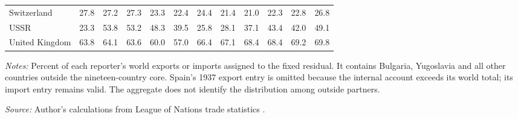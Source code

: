 \begin{landscape}
\begin{table}[!htbp]
\begin{threeparttable}
\begin{tabular}{@{}lrrrrrrrrrrr@{}}
Switzerland & 27.8 & 27.2 & 27.3 & 23.3 & 22.4 & 24.4 & 21.4 & 21.0 & 22.3 & 22.8 & 26.8 \\
USSR & 23.3 & 53.8 & 53.2 & 48.3 & 39.5 & 25.8 & 28.1 & 37.1 & 43.4 & 42.0 & 49.1 \\
United Kingdom & 63.8 & 64.1 & 63.6 & 60.0 & 57.0 & 66.4 & 67.1 & 68.4 & 68.4 & 69.2 & 69.8 \\
\bottomrule
\end{tabular}
\begin{tablenotes}[flushleft]\footnotesize\item \textit{Notes:} Percent of each reporter's world exports or imports assigned to the fixed \External{} residual. It contains Bulgaria, Yugoslavia and all other countries outside the nineteen-country core. Spain's 1937 export entry is omitted because the internal account exceeds its world total; its import entry remains valid. The aggregate does not identify the distribution among outside partners.
\item \textit{Source:} Author's calculations from League of Nations trade statistics \parencite{league1930,league1936,league1938}.
\end{tablenotes}\end{threeparttable}\end{table}
\end{landscape}\clearpage
